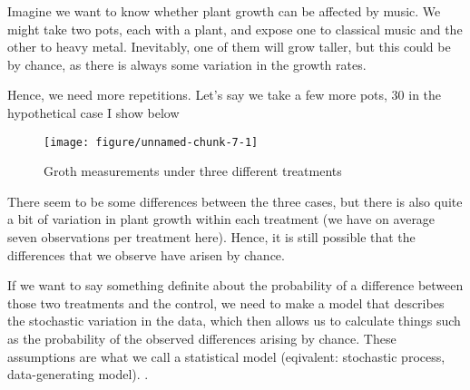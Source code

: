 \documentclass[a4paper,twoside]{tufte-book}\usepackage[]{graphicx}\usepackage[]{color}
\makeatletter
\def\maxwidth{ %
  \ifdim\Gin@nat@width>\linewidth
    \linewidth
  \else
    \Gin@nat@width
  \fi
}
\makeatother
\begin{document}

Imagine we want to know whether plant growth can be affected by music. We might take two pots, each with a plant, and expose one to classical music and the other to heavy metal. Inevitably, one of them will grow taller, but this could be by chance, as there is always some variation in the growth rates. 

Hence, we need more repetitions. Let's say we take a few more pots, 30 in the hypothetical case I show below

\begin{figure}[htbp]
\begin{center}
\begin{Schunk}

\texttt{[image: figure/unnamed-chunk-7-1]} \end{Schunk}
\caption{Groth measurements under three different treatments}
\label{fig: plant growth music}
\end{center}
\end{figure}

There seem to be some differences between the three cases, but there is also quite a bit of variation in plant growth within each treatment (we have on average seven observations per treatment here). Hence, it is still possible that the differences that we observe have arisen by chance. 

If we want to say something definite about the probability of a difference between those two treatments and the control, we need to make a model that describes the stochastic variation in the data, which then allows us to calculate things such as the probability of the observed differences arising by chance. These assumptions are what we call a statistical model (eqivalent: stochastic process, data-generating model). . 
\end{document}
